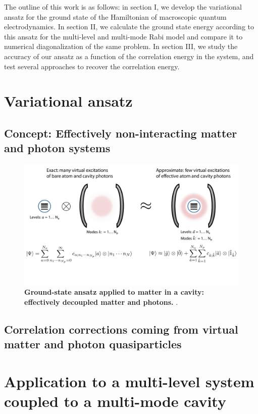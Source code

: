 \documentclass[aps,prb,twocolumn,
	groupedaddress,superscriptaddress,
	amsfonts,amssymb,amsmath,floatfix,
	citeautoscript]{revtex4-1}
\begin{document}
The outline of this work is as follows: in section I, we develop the variational ansatz for the ground state of the Hamiltonian of macroscopic quantum electrodynamics. In section II, we calculate the ground state energy according to this ansatz for the multi-level and multi-mode Rabi model and compare it to numerical diagonalization of the same problem. In section III, we study the accuracy of our ansatz as a function of the correlation energy in the system, and test several approaches to recover the correlation energy. 

\section{Variational ansatz}

\subsection{Concept: Effectively non-interacting matter and photon systems}
\begin{figure}[t]
\includegraphics[width=18cm]{conceptfigure.pdf}
\caption{\textbf{Ground-state ansatz applied to matter in a cavity: effectively decoupled matter and photons.} .}
\label{fig:ansatz}
\end{figure}

\subsection{Correlation corrections coming from virtual matter and photon quasiparticles}

\section{Application to a multi-level system coupled to a multi-mode cavity}
\end{document}

